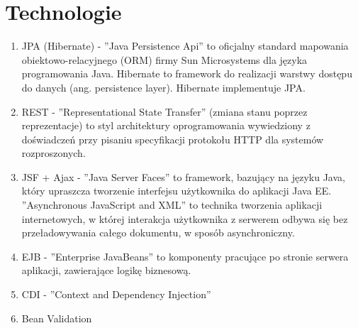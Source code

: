 \documentclass[a4paper]{article}
\begin{document}
\section{Technologie}
\begin{enumerate}
\item JPA (Hibernate) - ''Java Persistence Api'' to oficjalny standard mapowania obiektowo-relacyjnego (ORM) firmy Sun Microsystems dla języka programowania Java. Hibernate to framework do realizacji warstwy dostępu do danych (ang. persistence layer). Hibernate implementuje JPA.
\item REST - ''Representational State Transfer'' (zmiana stanu poprzez reprezentacje) to styl architektury oprogramowania wywiedziony z doświadczeń przy pisaniu specyfikacji protokołu HTTP dla systemów rozproszonych.
\item JSF + Ajax - ''Java Server Faces'' to framework, bazujący na języku Java, który upraszcza tworzenie interfejsu użytkownika do aplikacji Java EE. ''Asynchronous JavaScript and XML'' to technika tworzenia aplikacji internetowych, w której interakcja użytkownika z serwerem odbywa się bez przeładowywania całego dokumentu, w sposób asynchroniczny.
\item EJB - ''Enterprise JavaBeans'' to komponenty pracujące po stronie serwera aplikacji, zawierające logikę biznesową.
\item CDI - ''Context and Dependency Injection''
\item Bean Validation
\end{enumerate}
\end{document}

